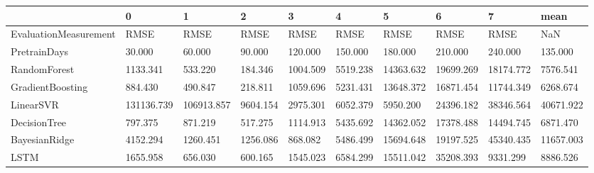 \begin{tabular}{llllllllll}
\toprule
{} &          0 &          1 &        2 &        3 &        4 &         5 &         6 &         7 &      mean \\
\midrule
EvaluationMeasurement &       RMSE &       RMSE &     RMSE &     RMSE &     RMSE &      RMSE &      RMSE &      RMSE &       NaN \\
PretrainDays          &     30.000 &     60.000 &   90.000 &  120.000 &  150.000 &   180.000 &   210.000 &   240.000 &   135.000 \\
RandomForest          &   1133.341 &    533.220 &  184.346 & 1004.509 & 5519.238 & 14363.632 & 19699.269 & 18174.772 &  7576.541 \\
GradientBoosting      &    884.430 &    490.847 &  218.811 & 1059.696 & 5231.431 & 13648.372 & 16871.454 & 11744.349 &  6268.674 \\
LinearSVR             & 131136.739 & 106913.857 & 9604.154 & 2975.301 & 6052.379 &  5950.200 & 24396.182 & 38346.564 & 40671.922 \\
DecisionTree          &    797.375 &    871.219 &  517.275 & 1114.913 & 5435.692 & 14362.052 & 17378.488 & 14494.745 &  6871.470 \\
BayesianRidge         &   4152.294 &   1260.451 & 1256.086 &  868.082 & 5486.499 & 15694.648 & 19197.525 & 45340.435 & 11657.003 \\
LSTM                  &   1655.958 &    656.030 &  600.165 & 1545.023 & 6584.299 & 15511.042 & 35208.393 &  9331.299 &  8886.526 \\
\bottomrule
\end{tabular}
